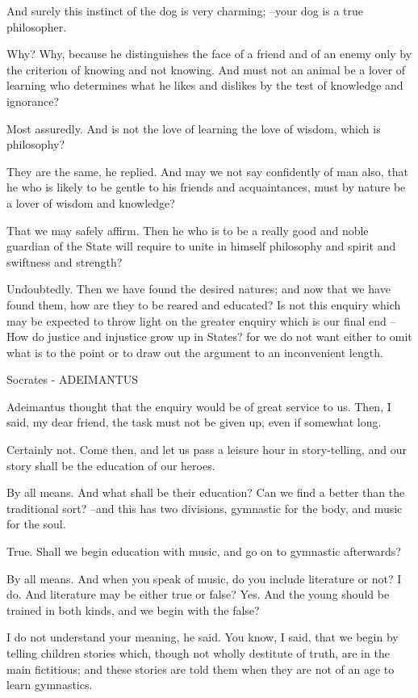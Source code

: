 And surely this instinct of the dog is very charming; --your dog is a true philosopher.

Why?
Why, because he distinguishes the face of a friend and of an enemy only by the criterion of knowing and not knowing. And must not an animal be a lover of learning who determines what he likes and dislikes by the test of knowledge and ignorance?

Most assuredly.
And is not the love of learning the love of wisdom, which is philosophy?

They are the same, he replied.
And may we not say confidently of man also, that he who is likely to be gentle to his friends and acquaintances, must by nature be a lover of wisdom and knowledge?

That we may safely affirm.
Then he who is to be a really good and noble guardian of the State will require to unite in himself philosophy and spirit and swiftness and strength?

Undoubtedly.
Then we have found the desired natures; and now that we have found them, how are they to be reared and educated? Is not this enquiry which may be expected to throw light on the greater enquiry which is our final end --How do justice and injustice grow up in States? for we do not want either to omit what is to the point or to draw out the argument to an inconvenient length.

Socrates - ADEIMANTUS

Adeimantus thought that the enquiry would be of great service to us.
Then, I said, my dear friend, the task must not be given up, even if somewhat long.

Certainly not.
Come then, and let us pass a leisure hour in story-telling, and our story shall be the education of our heroes.

By all means.
And what shall be their education? Can we find a better than the traditional sort? --and this has two divisions, gymnastic for the body, and music for the soul.

True.
Shall we begin education with music, and go on to gymnastic afterwards?

By all means.
And when you speak of music, do you include literature or not?
I do.
And literature may be either true or false?
Yes.
And the young should be trained in both kinds, and we begin with the false?

I do not understand your meaning, he said.
You know, I said, that we begin by telling children stories which, though not wholly destitute of truth, are in the main fictitious; and these stories are told them when they are not of an age to learn gymnastics.


